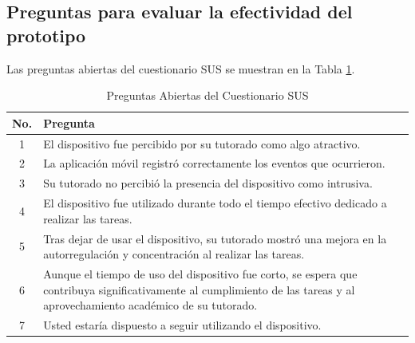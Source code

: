 \documentclass[a4paper,fleqn]{cas-sc}
\begin{document}
	\subsection[\appendixname~\thesection]{Preguntas para evaluar la efectividad del prototipo}
	\label{Appendix:Effectivity}
	Las preguntas abiertas del cuestionario SUS se muestran en la Tabla \ref{tab:EffectivityQuestions}.
	\begin{table}[bt!]
		\centering
		\caption{Preguntas Abiertas del Cuestionario SUS \label{tab:EffectivityQuestions}}	
		\begin{tabularx}{\textwidth}{c X }
			\toprule
			\textbf{No.} & \textbf{Pregunta} \\
			\midrule
			1 & El dispositivo fue percibido por su tutorado como algo atractivo. \\
			2 & La aplicación móvil registró correctamente los eventos que ocurrieron. \\
			3 & Su tutorado no percibió la presencia del dispositivo como intrusiva. \\
			4 & El dispositivo fue utilizado durante todo el tiempo efectivo dedicado a realizar las tareas. \\
			5 & Tras dejar de usar el dispositivo, su tutorado mostró una mejora en la autorregulación y concentración al realizar las tareas. \\
			6 & Aunque el tiempo de uso del dispositivo fue corto, se espera que contribuya significativamente al cumplimiento de las tareas y al aprovechamiento académico de su tutorado. \\
			7 & Usted estaría dispuesto a seguir utilizando el dispositivo. \\
			\bottomrule
		\end{tabularx}
	\end{table}	
\end{document}
